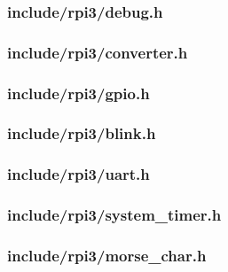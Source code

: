 \subsubsection*{include/rpi3/debug.h}


\subsubsection*{include/rpi3/converter.h}


\subsubsection*{include/rpi3/gpio.h}


\subsubsection*{include/rpi3/blink.h}


\subsubsection*{include/rpi3/uart.h}


\subsubsection*{include/rpi3/system\_timer.h}


\subsubsection*{include/rpi3/morse\_char.h}


